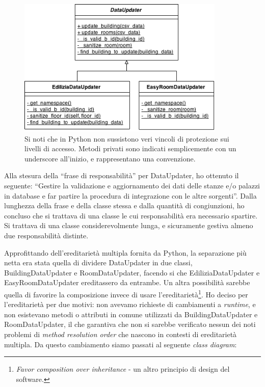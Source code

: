 \documentclass[12pt]{report}
\begin{document}
\begin{figure}[H]
    \centering
    \includegraphics[width=280pt,natwidth=442,natheight=296]{class_diagram_dataupdater_before.png}
    \caption{Si noti che in Python non sussistono veri vincoli di protezione
    sui livelli di accesso. Metodi privati sono indicati semplicemente con
    un underscore all'inizio, e rappresentano una convenzione.}
    \label{fig:class_diagram_dataupdater_before}
\end{figure}

Alla stesura della ``frase di responsabilità'' per DataUpdater, ho
ottenuto il seguente: 
``Gestire la validazione e aggiornamento dei dati delle stanze 
e/o palazzi in database e far partire la procedura di integrazione
con le altre sorgenti''. 
Dalla lunghezza della frase e della classe stessa e dalla quantità di 
congiunzioni, ho concluso che si trattava di una classe le cui responsabilità
era necessario spartire. Si trattava di una classe considerevolmente lunga, 
e sicuramente gestiva almeno due responsabilità distinte.

Approfittando dell'ereditarietà multipla fornita da Python, la separazione più netta
era stata quella di dividere DataUpdater in due classi, 
BuildingDataUpdater e RoomDataUpdater, facendo si che EdiliziaDataUpdater 
e EasyRoomDataUpdater ereditassero da entrambe. Un altra possibilità 
sarebbe quella di favorire la composizione invece di usare l'ereditarietà\footnote{
\textit{Favor composition over inheritance} - un altro principio di
design del software.
}. 
Ho deciso per l'ereditarietà per due motivi: non avevamo richieste di 
cambiamenti a \textit{runtime}, e non esistevano metodi o attributi 
in comune utilizzati da BuildingDataUpdater e RoomDataUpdater, il che garantiva 
che non si sarebbe verificato nessun dei noti problemi di 
\textit{method resolution 
order} che nascono in contesti di ereditarietà multipla. Da questo cambiamento
siamo passati al seguente \textit{class diagram}:
\end{document}
